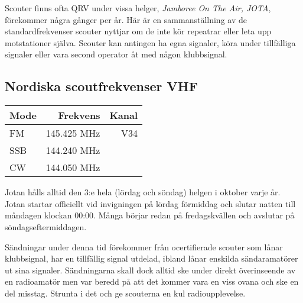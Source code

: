 Scouter finns ofta QRV under vissa helger, \textit{Jamboree On The Air, JOTA}, förekommer några gånger per år. Här är en sammanställning av de standardfrekvenser scouter nyttjar om de inte kör repeatrar eller leta upp motstationer själva. Scouter kan antingen ha egna signaler, köra under
tillfälliga signaler eller vara second operator åt med någon klubbsignal.

\subsection{Nordiska scoutfrekvenser VHF}

\begin{center}
\begin{tabular}{lrr}
	\textbf{Mode} & \textbf{Frekvens} & \textbf{Kanal} \\ \hline
	FM            &      145.425  MHz &   V34 \\
	SSB           &      144.240  MHz &  \\
	CW            &      144.050  MHz &
\end{tabular}
\end{center}

Jotan hålls alltid den 3:e hela (lördag och söndag) helgen i oktober varje år. Jotan startar officiellt vid invigningen på lördag förmiddag och slutar natten till måndagen klockan 00:00. Många börjar redan på fredagskvällen och avslutar på söndagseftermiddagen.

Sändningar under denna tid förekommer från ocertifierade scouter som lånar klubbsignal, har en tillfällig signal utdelad, ibland lånar enskilda sändaramatörer ut sina signaler. Sändningarna skall dock alltid ske under direkt överinseende av en radioamatör men var beredd på att det kommer vara en
viss ovana och ske en del misstag. Strunta i det och ge scouterna en kul radioupplevelse.

